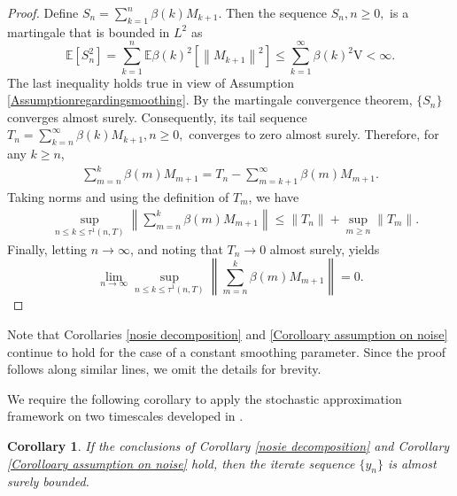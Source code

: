 \documentclass[9pt,journal,twoside,web]{ieeecolor}
\newtheorem{Corollary}{Corollary}
\newcommand{\norm}[1]{\left\lVert #1 \right\rVert}
\begin{document}
\begin{proof}
    Define  $  S_n = \sum\limits_{k=1}^{n} \beta(k) M_{k+1}.$ 
 Then the sequence ${S_n},n\geq 0,$ is a martingale that is bounded in $L^2$ as 
    \begin{equation*}
        \mathbb{E}[S_n^2] = \sum\limits_{k=1}^{n} \mathbb{E} \beta(k)^2 [\norm{M_{k+1}}^2] \leq  \sum\limits_{k=1}^{\infty} \beta(k)^2 \mathrm{V} < \infty.
    \end{equation*}
    \color{black}
The last inequality holds true in view of Assumption \ref{Assumptionregardingsmoothing}.
    \color{black}
   By the martingale convergence theorem, $\{S_n\}$ converges almost surely. Consequently, its tail sequence  $T_n = \sum\limits_{k=n}^{\infty} \beta(k) M_{k+1}, n\geq 0,$
    converges to zero almost surely. Therefore, for any $k \geq n$,
\begin{equation*}
\begin{split}
   \sum\limits_{m=n}^{k} \beta(m) M_{m+1} = T_n -  \sum\limits_{m=k+1}^{\infty} \beta(m) M_{m+1}.
    \end{split}
\end{equation*}
Taking norms and using the definition of $T_m$, we have
\begin{equation*}
\begin{split}
   & \sup\limits_{n \leq k \leq \tau^1(n,T)} \norm{\sum\limits_{m=n}^{k} \beta(m) M_{m+1}}
    \leq  \norm{T_n} + \sup\limits_{m \geq n} \norm{T_m}.
    \end{split}
\end{equation*}
Finally, letting $n \to \infty$, and noting that $T_n \to 0$ almost surely, yields
\begin{equation*}
   \lim\limits_{n \to \infty} \sup\limits_{n \leq k \leq \tau^1(n,T)} \norm{\sum\limits_{m=n}^{k} \beta(m)  M_{m+1}} = 0.
\end{equation*}
\end{proof}
\color{black}
Note that Corollaries \ref{nosie decomposition} and \ref{Corolloary assumption on noise} continue to hold for the case of a constant smoothing parameter. Since the proof follows along similar lines, we omit the details for brevity.

We require the following corollary to apply the stochastic approximation framework on two timescales developed in \cite{yaji2020stochastic}.

\begin{Corollary}
If the conclusions of Corollary \ref{nosie decomposition} and Corollary \ref{Corolloary assumption on noise} hold, then the iterate sequence $\{y_n\}$ is almost surely bounded.
\end{Corollary}
\end{document}
